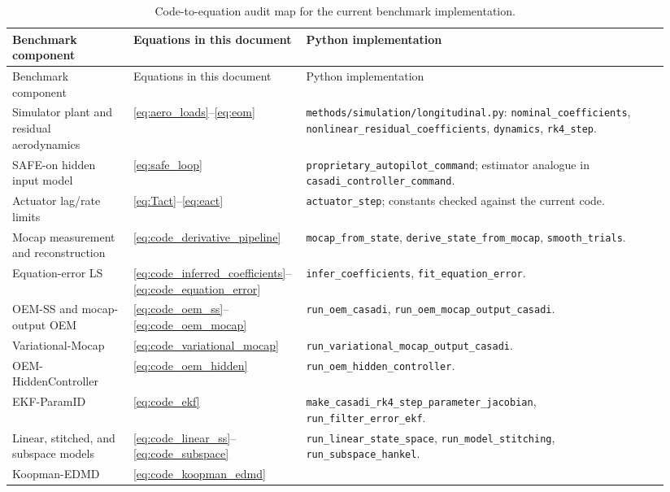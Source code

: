\documentclass[11pt]{article}
\begin{document}
\begingroup
\scriptsize
\setlength{\tabcolsep}{2pt}
\begin{longtable}{@{}p{0.18\linewidth}p{0.22\linewidth}p{0.54\linewidth}@{}}
\caption{Code-to-equation audit map for the current benchmark implementation.}
\label{tab:code_audit_map}\\
\toprule
Benchmark component & Equations in this document & Python implementation \\
\midrule
\endfirsthead
\toprule
Benchmark component & Equations in this document & Python implementation \\
\midrule
\endhead
Simulator plant and residual aerodynamics &
\eqref{eq:aero_loads}--\eqref{eq:eom} &
\texttt{methods/simulation/longitudinal.py}: \texttt{nominal\_coefficients},
\texttt{nonlinear\_residual\_coefficients}, \texttt{dynamics},
\texttt{rk4\_step}. \\
SAFE-on hidden input model &
\eqref{eq:safe_loop} &
\texttt{proprietary\_autopilot\_command}; estimator analogue in
\texttt{casadi\_controller\_command}. \\
Actuator lag/rate limits &
\eqref{eq:Tact}--\eqref{eq:eact} &
\texttt{actuator\_step}; constants checked against the current code. \\
Mocap measurement and reconstruction &
\eqref{eq:code_derivative_pipeline} &
\texttt{mocap\_from\_state}, \texttt{derive\_state\_from\_mocap},
\texttt{smooth\_trials}. \\
Equation-error LS &
\eqref{eq:code_inferred_coefficients}--\eqref{eq:code_equation_error} &
\texttt{infer\_coefficients}, \texttt{fit\_equation\_error}. \\
OEM-SS and mocap-output OEM &
\eqref{eq:code_oem_ss}--\eqref{eq:code_oem_mocap} &
\texttt{run\_oem\_casadi}, \texttt{run\_oem\_mocap\_output\_casadi}. \\
Variational-Mocap &
\eqref{eq:code_variational_mocap} &
\texttt{run\_variational\_mocap\_output\_casadi}. \\
OEM-HiddenController &
\eqref{eq:code_oem_hidden} &
\texttt{run\_oem\_hidden\_controller}. \\
EKF-ParamID &
\eqref{eq:code_ekf} &
\texttt{make\_casadi\_rk4\_step\_parameter\_jacobian}, \texttt{run\_filter\_error\_ekf}. \\
Linear, stitched, and subspace models &
\eqref{eq:code_linear_ss}--\eqref{eq:code_subspace} &
\texttt{run\_linear\_state\_space}, \texttt{run\_model\_stitching},
\texttt{run\_subspace\_hankel}. \\
Koopman-EDMD &
\eqref{eq:code_koopman_edmd} &

\end{longtable}
\end{document}
